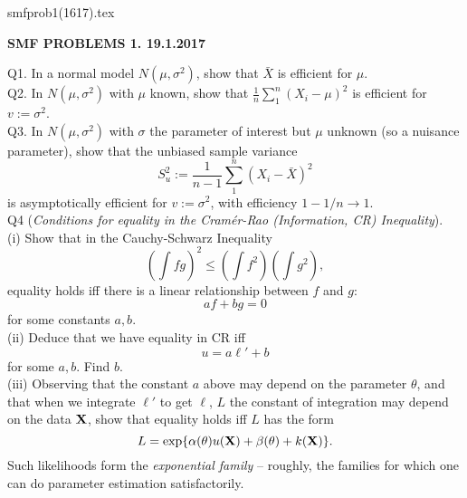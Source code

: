 \documentclass[12pt]{article}
\begin{document}
\def\ni{\noindent}
\def\i{\indent}
\def\a{\alpha}
\def\b{\beta}
\def\e{\epsilon}
\def\d{\delta}
\def\g{\gamma}
\def\qq{\qquad}
\def\L{\Lambda}
\def\C{\cal C}
\def\E{\cal E}
\def\G{\Gamma}
\def\F{\cal F}
\def\K{\cal K}
\def\O{\cal O}
\def\A{\cal A}
\def\B{\cal B}
\def\S{\cal S}
\def\N{\cal N}
\def\M{\cal M}
\def\P{\cal P}
\def\Om{\Omega}
\def\om{\omega}
\def\s{\sigma}
\def\t{\theta}
\def\z{\zeta}
\def\p{\phi}
\def\m{\mu}
\def\n{\nu}
\def\b{\beta}
\def\e{\epsilon}
\def\l{\lambda}
\def\Si{\Sigma}
\def\half{\frac{1}{2}}
\def\hb{\hfil \break}
\ni smfprob1(1617).tex \\
\begin{center}
{\bf SMF PROBLEMS 1.  19.1.2017} \\
\end{center}

\ni Q1.  In a normal model $N(\m, {\s}^2)$, show that $\bar{X}$ is efficient for $\m$.\\

\ni Q2.  In $N(\m, {\s}^2)$ with $\m$ known, show that $\frac{1}{n} \sum_1^n (X_i - \m)^2$ is efficient for $v := {\s}^2$. \\

\ni Q3.  In $N(\mu, {\sigma}^2)$ with $\sigma$ the parameter of interest but $\mu$ unknown (so a nuisance parameter), show that the unbiased sample variance
$$
S_u^2 := \frac{1}{n-1} \sum_1^n (X_i - \bar X)^2
$$
is asymptotically efficient for $v := {\sigma}^2$, with efficiency $1 - 1/n \to 1$. \\

\ni Q4 ({\it Conditions for equality in the Cram\'er-Rao (Information, CR) Inequality}). \\
(i) Show that in the Cauchy-Schwarz Inequality
$$
(\int fg)^2 \leq (\int f^2)(\int g^2),
$$
equality holds iff there is a linear relationship between $f$ and $g$:
$$
af + bg = 0
$$
for some constants $a, b$. \\
(ii) Deduce that we have equality in CR iff
$$
u = a {\ell}' + b
$$
for some $a,b$.  Find $b$. \\
(iii) Observing that the constant $a$ above may depend on the parameter $\t$, and that when we integrate ${\ell}'$ to get $\ell$, $L$ the constant of integration may depend on the data $\bf X$, show that equality holds iff $L$ has the form
$$
L = \exp \{ \a(\t) u({\bf X}) + \b(\t) + k({\bf X}) \}.
$$
Such likelihoods form the {\it exponential family} -- roughly, the families for which one can do parameter estimation satisfactorily. \\
\end{document}
